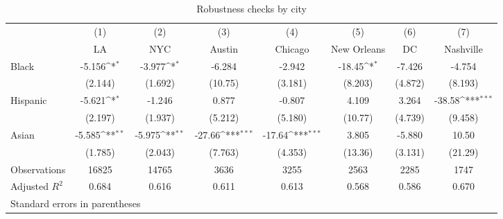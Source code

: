 {
\def\sym#1{\ifmmode^{#1}\else\(^{#1}\)\fi}
\begin{longtable}{l*{7}{c}}
\caption{Robustness checks by city}\\
\hline\hline\endfirsthead\hline\endhead\hline\endfoot\endlastfoot
                    &\multicolumn{1}{c}{(1)}&\multicolumn{1}{c}{(2)}&\multicolumn{1}{c}{(3)}&\multicolumn{1}{c}{(4)}&\multicolumn{1}{c}{(5)}&\multicolumn{1}{c}{(6)}&\multicolumn{1}{c}{(7)}\\
                    &\multicolumn{1}{c}{LA}&\multicolumn{1}{c}{NYC}&\multicolumn{1}{c}{Austin}&\multicolumn{1}{c}{Chicago}&\multicolumn{1}{c}{New Orleans}&\multicolumn{1}{c}{DC}&\multicolumn{1}{c}{Nashville}\\
\hline
Black               &      -5.156\sym{*}  &      -3.977\sym{*}  &      -6.284         &      -2.942         &      -18.45\sym{*}  &      -7.426         &      -4.754         \\
                    &     (2.144)         &     (1.692)         &     (10.75)         &     (3.181)         &     (8.203)         &     (4.872)         &     (8.193)         \\
[1em]
Hispanic            &      -5.621\sym{*}  &      -1.246         &       0.877         &      -0.807         &       4.109         &       3.264         &      -38.58\sym{***}\\
                    &     (2.197)         &     (1.937)         &     (5.212)         &     (5.180)         &     (10.77)         &     (4.739)         &     (9.458)         \\
[1em]
Asian               &      -5.585\sym{**} &      -5.975\sym{**} &      -27.66\sym{***}&      -17.64\sym{***}&       3.805         &      -5.880         &       10.50         \\
                    &     (1.785)         &     (2.043)         &     (7.763)         &     (4.353)         &     (13.36)         &     (3.131)         &     (21.29)         \\
\hline
Observations        &       16825         &       14765         &        3636         &        3255         &        2563         &        2285         &        1747         \\
Adjusted \(R^{2}\)  &       0.684         &       0.616         &       0.611         &       0.613         &       0.568         &       0.586         &       0.670         \\
\hline\hline
\multicolumn{8}{l}{\footnotesize Standard errors in parentheses}\\

\end{longtable}}

